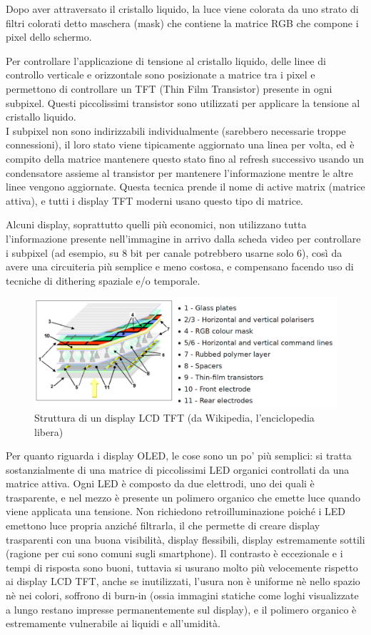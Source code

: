 Dopo aver attraversato il cristallo liquido, la luce viene colorata da uno strato di filtri colorati detto maschera (mask) che contiene la matrice RGB che compone i pixel dello schermo.

Per controllare l'applicazione di tensione al cristallo liquido, delle linee di controllo verticale e orizzontale sono posizionate a matrice tra i pixel e permettono di controllare un TFT (Thin Film Transistor) presente in ogni subpixel. Questi piccolissimi transistor sono utilizzati per applicare la tensione al cristallo liquido.\\
I subpixel non sono indirizzabili individualmente (sarebbero necessarie troppe connessioni), il loro stato viene tipicamente aggiornato una linea per volta, ed è compito della matrice mantenere questo stato fino al refresh successivo usando un condensatore assieme al transistor per mantenere l'informazione mentre le altre linee vengono aggiornate. Questa tecnica prende il nome di active matrix (matrice attiva), e tutti i display TFT moderni usano questo tipo di matrice.

Alcuni display, soprattutto quelli più economici, non utilizzano tutta l'informazione presente nell'immagine in arrivo dalla scheda video per controllare i subpixel (ad esempio, su 8 bit per canale potrebbero usarne solo 6), così da avere una circuiteria più semplice e meno costosa, e compensano facendo uso di tecniche di dithering spaziale e/o temporale.

\begin{figure}[h]
	\centering
	\includegraphics[width=\textwidth]{Introduzione_files/lcdtft.png}
	\caption{Struttura di un display LCD TFT (da Wikipedia, l'enciclopedia libera)}
	\label{fig:lcdtft}
\end{figure}

Per quanto riguarda i display OLED, le cose sono un po' più semplici: si tratta sostanzialmente di una matrice di piccolissimi LED organici controllati da una matrice attiva. Ogni LED è composto da due elettrodi, uno dei quali è trasparente, e nel mezzo è presente un polimero organico che emette luce quando viene applicata una tensione. Non richiedono retroilluminazione poiché i LED emettono luce propria anziché filtrarla, il che permette di creare display trasparenti con una buona visibilità, display flessibili, display estremamente sottili (ragione per cui sono comuni sugli smartphone). Il contrasto è eccezionale e i tempi di risposta sono buoni, tuttavia si usurano molto più velocemente rispetto ai display LCD TFT, anche se inutilizzati, l'usura non è uniforme nè nello spazio nè nei colori, soffrono di burn-in (ossia immagini statiche come loghi visualizzate a lungo restano impresse permanentemente sul display), e il polimero organico è estremamente vulnerabile ai liquidi e all'umidità.


